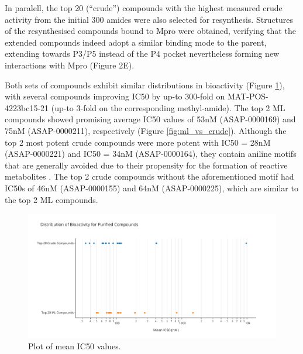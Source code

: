 
In paralell, the top 20 (``crude'') compounds with the highest measured crude activity from the initial 300 amides were also selected for resynthesis. Structures of the resynthesised compounds bound to Mpro were obtained, verifying that the extended compounds indeed adopt a similar binding mode to the parent, extending towards P3/P5 instead of the P4 pocket nevertheless forming new interactions with Mpro (Figure 2E).

Both sets of compounds exhibit similar distributions in bioactivity (Figure \ref{fig:strip}), with several compounds improving IC50 by up-to 300-fold on MAT-POS-4223bc15-21 (up-to 3-fold on the corresponding methyl-amide). The top 2 ML compounds showed promising average IC50 values of 53nM (ASAP-0000169) and 75nM (ASAP-0000211), respectively (Figure \ref{fig:ml_vs_crude}). Although the top 2 most potent crude compounds were  more potent with IC50 = 28nM (ASAP-0000221) and IC50 = 34nM (ASAP-0000164), they contain aniline motifs that are generally avoided due to their propensity for the formation of reactive metabolites \cite{Stepan2011aniline}. The top 2 crude compounds without the aforementioned motif had IC50s of 46nM (ASAP-0000155) and 64nM (ASAP-0000225), which are similar to the top 2 ML compounds.

\begin{figure}[!t]
    \centering
    \includegraphics[width=\textwidth]{Chapters/Crude/Figs/strip_plot.pdf}
    \caption{Plot of mean IC50 values.}
    \label{fig:strip}
\end{figure}

